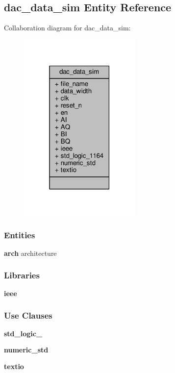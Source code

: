 \subsection{dac\+\_\+data\+\_\+sim Entity Reference}
\label{classdac__data__sim}


Collaboration diagram for dac\+\_\+data\+\_\+sim\+:\nopagebreak
\begin{figure}[H]
\begin{center}
\leavevmode
\includegraphics[width=171pt]{d5/d47/classdac__data__sim__coll__graph}
\end{center}
\end{figure}
\subsubsection*{Entities}
\begin{DoxyCompactItemize}
\item 
{\bf arch} architecture
\end{DoxyCompactItemize}
\subsubsection*{Libraries}
 \begin{DoxyCompactItemize}
\item 
{\bf ieee} 
\end{DoxyCompactItemize}
\subsubsection*{Use Clauses}
 \begin{DoxyCompactItemize}
\item 
{\bf std\+\_\+logic\+\_}   
\item 
{\bf numeric\+\_\+std}   
\item 
{\bf textio}   
\end{DoxyCompactItemize}
